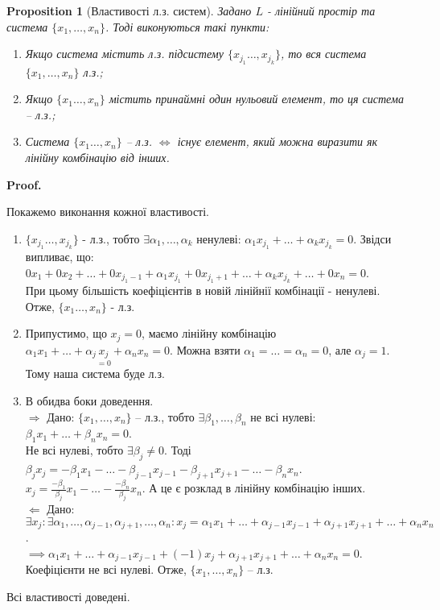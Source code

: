 \documentclass[a4paper, 10pt]{article}
\makeatletter
\def\rightproof{$\boxed{\Rightarrow}$ }
\def\leftproof{$\boxed{\Leftarrow}$ }
\theoremstyle{theoremdd}
\newtheorem{proposition}[theorem]{Proposition}
\renewenvironment{proof}[1][Proof.\\]{\par
\pushQED{\hfill \qed}%
\normalfont \topsep6\p@\@plus6\p@\relax
\trivlist
\item\relax
{\bfseries
#1\@addpunct{.}}\hspace\labelsep\ignorespaces
}{%
\popQED\endtrivlist\@endpefalse
}
\makeatother
\begin{document}
	\begin{proposition}[Властивості л.з. систем]
	Задано $L$ - лінійний простір та система $\{x_1,\dots,x_n\}$. Тоді виконуються такі пункти:
	\begin{enumerate}[nosep, wide = 0pt, label={\arabic*)}]
	\item Якщо система містить л.з. підсистему $\{x_{j_1} \dots, x_{j_k}\}$, то вся система $\{x_1,\dots,x_n\}$ л.з.;
	\item Якщо $\{x_1 \dots, x_n\}$ містить принаймні один нульовий елемент, то ця система -- л.з.;
	\item Система $\{x_1 \dots, x_n\}$ -- л.з. $\iff$ існує елемент, який можна виразити як лінійну комбінацію від інших.
	\end{enumerate}
	\end{proposition}
	
	\begin{proof}
	Покажемо виконання кожної властивості.
	\begin{enumerate}[topsep=-\parskip, wide=0pt, label={\arabic*)}]
	\item $\{x_{j_1} \dots, x_{j_k}\}$ - л.з., тобто $\exists \alpha_1, \dots, \alpha_k$ ненулеві: $\alpha_1 x_{j_1} + \dots + \alpha_k x_{j_k} = 0$. Звідси випливає, що:\\
	$0x_1 + 0x_2 + \dots + 0x_{j_1-1} + \alpha_1 x_{j_1} + 0x_{j_1 + 1} + \dots + \alpha_k x_{j_k} + \dots + 0 x_n = 0$.\\
	При цьому більшість коефіцієнтів в новій лінійнії комбінації - ненулеві. Отже, $\{x_1 \dots, x_n\}$ - л.з.
	\item Припустимо, що $x_j = 0$, маємо лінійну комбінацію $\alpha_1 x_1 + \dots + \alpha_j \underset{=0}{x_j} + \alpha_n x_n = 0$. Можна взяти $\alpha_1 = \dots = \alpha_n = 0$, але $\alpha_j = 1$. Тому наша система буде л.з.
	\item В обидва боки доведення.\\
	\rightproof Дано: $\{x_1, \dots, x_n\}$ -- л.з., тобто $\exists \beta_1, \dots, \beta_n$ не всі нулеві: $\beta_1 x_1 + \dots + \beta_n x_n = 0$.\\
	Не всі нулеві, тобто $\exists \beta_j \neq 0$. Тоді
	$\beta_j x_j = -\beta_1 x_1 - \dots - \beta_{j-1} x_{j-1} - \beta_{j+1} x_{j+1} - \dots - \beta_n x_n$.\\
	$\displaystyle x_j = \frac{-\beta_1}{\beta_j}x_1 - \dots - \frac{-\beta_n}{\beta_j}x_n$. А це є розклад в лінійну комбінацію інших.
	\bigskip \\
	\leftproof Дано: $\exists x_j: \exists \alpha_1, \dots, \alpha_{j-1}, \alpha_{j+1}, \dots, \alpha_n: x_j = \alpha_1 x_1 + \dots + \alpha_{j-1} x_{j-1} + \alpha_{j+1} x_{j+1} + \dots + \alpha_n x_n$.\\
	$\implies \alpha_1 x_1 + \dots + \alpha_{j-1} x_{j-1} + (-1)x_j + \alpha_{j+1} x_{j+1} + \dots + \alpha_n x_n = 0$.\\
	Коефіцієнти не всі нулеві. Отже, $\{x_1, \dots, x_n\}$ -- л.з.
	\end{enumerate}
	Всі властивості доведені.
	\end{proof}
	
\end{document}
